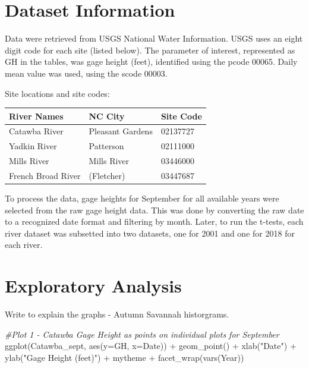 \documentclass[
  12pt,
]{article}
\newenvironment{Shaded}{\begin{snugshade}}{\end{snugshade}}
\newcommand{\AttributeTok}[1]{\textcolor[rgb]{0.77,0.63,0.00}{#1}}
\newcommand{\CommentTok}[1]{\textcolor[rgb]{0.56,0.35,0.01}{\textit{#1}}}
\newcommand{\FunctionTok}[1]{\textcolor[rgb]{0.00,0.00,0.00}{#1}}
\newcommand{\NormalTok}[1]{#1}
\newcommand{\SpecialCharTok}[1]{\textcolor[rgb]{0.00,0.00,0.00}{#1}}
\newcommand{\StringTok}[1]{\textcolor[rgb]{0.31,0.60,0.02}{#1}}
\begin{document}
\newpage

\hypertarget{dataset-information}{%
\section{Dataset Information}\label{dataset-information}}

Data were retrieved from USGS National Water Information. USGS uses an
eight digit code for each site (listed below). The parameter of
interest, represented as GH in the tables, was gage height (feet),
identified using the pcode 00065. Daily mean value was used, using the
scode 00003.

Site locations and site codes:

\begin{longtable}[]{@{}lll@{}}
\toprule
River Names & NC City & Site Code\tabularnewline
\midrule
\endhead
Catawba River & Pleasant Gardens & 02137727\tabularnewline
Yadkin River & Patterson & 02111000\tabularnewline
Mills River & Mills River & 03446000\tabularnewline
French Broad River & (Fletcher) & 03447687\tabularnewline
\bottomrule
\end{longtable}

To process the data, gage heights for September for all available years
were selected from the raw gage height data. This was done by converting
the raw date to a recognized date format and filtering by month. Later,
to run the t-tests, each river dataset was subsetted into two datasets,
one for 2001 and one for 2018 for each river.

\newpage

\hypertarget{exploratory-analysis}{%
\section{Exploratory Analysis}\label{exploratory-analysis}}

Write to explain the graphs - Autumn Savannah historgrams.

\begin{Shaded}
\begin{Highlighting}[]
\CommentTok{\#Plot 1 {-} Catawba Gage Height as points on individual plots for September}
\FunctionTok{ggplot}\NormalTok{(Catawba\_sept, }\FunctionTok{aes}\NormalTok{(}\AttributeTok{y=}\NormalTok{GH, }\AttributeTok{x=}\NormalTok{Date)) }\SpecialCharTok{+}
  \FunctionTok{geom\_point}\NormalTok{() }\SpecialCharTok{+}
  \FunctionTok{xlab}\NormalTok{(}\StringTok{"Date"}\NormalTok{) }\SpecialCharTok{+}
  \FunctionTok{ylab}\NormalTok{(}\StringTok{"Gage Height (feet)"}\NormalTok{) }\SpecialCharTok{+}
\NormalTok{  mytheme }\SpecialCharTok{+}
  \FunctionTok{facet\_wrap}\NormalTok{(}\FunctionTok{vars}\NormalTok{(Year)) }
\end{Highlighting}
\end{Shaded}
\end{document}
